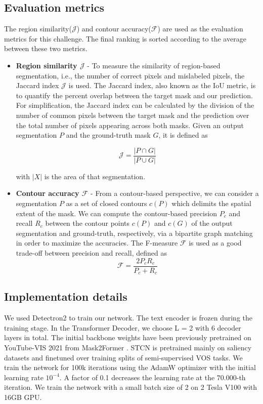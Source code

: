 \subsection{Evaluation metrics}
The region similarity($\mathcal{J}$) and contour accuracy($\mathcal{F}$) are used as the evaluation metrics for this challenge. The final ranking is sorted according to the average between these two metrics. 
\label{sec:metric}
\begin{itemize}
    \item \textbf{Region similarity $\mathcal{J}$} - To measure the similarity of region-based segmentation, i.e., the number of correct pixels and mislabeled pixels, the Jaccard index $\mathcal{J}$ is used. The Jaccard index, also known as the IoU metric, is to quantify the percent overlap between the target mask and our prediction. For simplification, the Jaccard index can be calculated by the division of the number of common pixels between the target mask and the prediction over the total number of pixels appearing across both masks. Given an output segmentation $P$ and the ground-truth mask $G$, it is defined as  

\begin{equation}
    \mathcal{J} = \frac{|P \cap G|}{|P \cup G|}
\end{equation}

with $|X|$ is the area of that segmentation. 
    \item \textbf{ Contour accuracy $\mathcal{F}$} - From a contour-based perspective, we can consider a segmentation $P$ as a set of closed contours $c(P)$ which delimits the spatial extent of the mask. We can compute the contour-based precision $P_c$ and recall $R_c$ between the contour points $c(P)$ and $c(G)$ of the output segmentation and ground-truth, respectively, via a bipartite graph matching in order to maximize the accuracies. The F-measure $\mathcal{F}$ is used as a good trade-off between precision and recall, defined as 
\begin{equation}
    \mathcal{F} = \frac{2P_c R_c}{P_c + R_c}
\end{equation}
\end{itemize}

\subsection{Implementation details}
We used Detectron2 to train our network. The text encoder is frozen during the training stage. In the Transformer Decoder, we choose L = 2 with 6 decoder layers in total. The initial backbone weights have been previously pretrained on YouTube-VIS 2021 from Mask2Former \cite{cheng_masked-attention_2022}. STCN is pretrained mainly on saliency datasets and finetuned over training splits of semi-supervised VOS tasks.
We train the network for 100k iterations using the AdamW optimizer with the initial learning rate $10^{−4}$. A factor of 0.1 decreases the learning rate at the $70.000$-th iteration. We train the network with a small batch size of 2 on 2 Tesla V100 with 16GB GPU.

